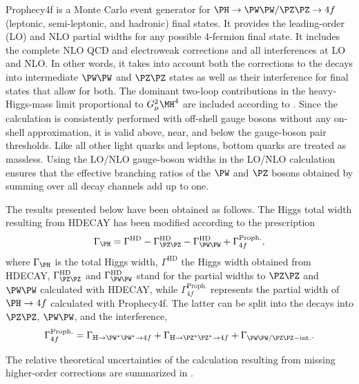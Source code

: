 {\sc Prophecy4f} is a Monte Carlo event generator for $\PH \to
\PW\PW/\PZ\PZ \to 4f$ (leptonic, semi-leptonic, and hadronic)
final states. It provides the leading-order (LO) and NLO partial widths for any
possible 4-fermion final state. It includes the complete NLO QCD and
electroweak corrections and all interferences at LO and NLO. In other
words, it takes into account both the corrections to the decays into
intermediate $\PW\PW$ and $\PZ\PZ$ states as well as their
interference for final states that allow for both. The dominant two-loop
contributions in the heavy-Higgs-mass limit proportional to $G_\mu^2
\MH^4$ are included according to .
Since the calculation is consistently performed with off-shell gauge
bosons without any on-shell approximation, it is valid above, near,
and below the gauge-boson pair thresholds. Like all other light quarks
and leptons, bottom quarks are treated as massless.  Using the LO/NLO
gauge-boson widths in the LO/NLO calculation ensures that the
effective branching ratios of the $\PW$ and $\PZ$ bosons obtained by summing
over all decay channels add up to one.

The results presented below have been obtained as follows. The Higgs total
width resulting from {\sc HDECAY} has been modified according to the
prescription
\begin{equation}
\Gamma_{\PH}=\Gamma^{\mathrm{HD}}-\Gamma^{\mathrm{HD}}_{\PZ\PZ}-\Gamma^{\mathrm{HD}}_{\PW\PW}+\Gamma^{\mathrm{Proph.}}_{4f}
,
\end{equation}
where $\Gamma_{\PH}$ is the total Higgs width, $\Gamma^{\mathrm{HD}}$
the Higgs width obtained from {\sc HDECAY},
$\Gamma^{\mathrm{HD}}_{\PZ\PZ}$ and $\Gamma^{\mathrm{HD}}_{\PW\PW}$
stand for the partial widths to $\PZ\PZ$ and $\PW\PW$ calculated with
{\sc HDECAY}, while $\Gamma^{\mathrm{Proph.}}_{4f}$ represents the
partial width of $\PH\to 4f$ calculated with {\sc Prophecy4f}.  The
latter can be split into the decays into $\PZ\PZ$, $\PW\PW$, and the
interference,
\begin{equation}
\Gamma^{\mathrm{Proph.}}_{4f}=\Gamma_{{\mathrm{H}}\to \PW^*\PW^*\to 4f}
+ \Gamma_{{\mathrm{H}}\to \PZ^*\PZ^*\to 4f}
+ \Gamma_{\mathrm{\PW\PW/\PZ\PZ-int.}}.
\end{equation}

The relative theoretical uncertainties of the calculation resulting
from  missing higher-order corrections are summarized in .


